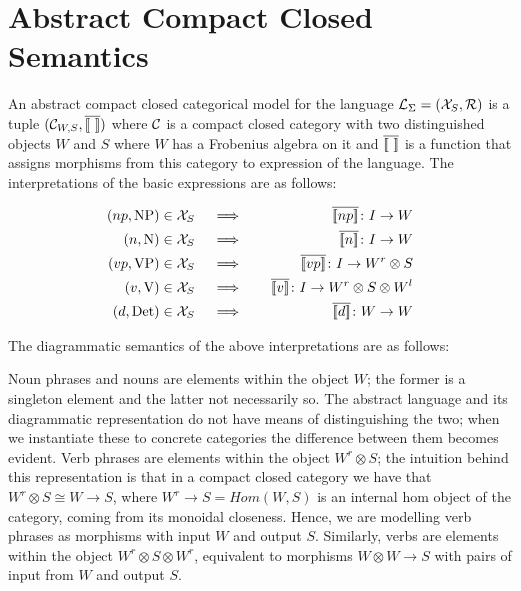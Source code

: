 \section{Abstract Compact Closed Semantics}


An abstract compact closed categorical model for the language  ${\cal L}_{\Sigma} = ({\cal X}_S, {\cal R})$  is  a tuple $({\cal C}_{W,S}, \overline{[\![ \  ]\!]})$ where  ${\cal C}$  is a compact closed category  with two distinguished objects $W$ and $S$ where  $W$ has a Frobenius algebra on it and $\overline{[\![ \  ]\!]}$ is a function that   assigns  morphisms from this category to  expression of the language. The interpretations of  the basic expressions  are as follows:

\begin{eqnarray*}
(np, \text{NP}) \in {\cal X}_S   &\quad \implies \quad& \overline{\semantics{np}} \colon I \to W \\
(n, \text{N}) \in {\cal X}_S   &\quad \implies \quad& \overline{\semantics{n}} \colon I \to W \\
(vp,  \text{VP}) \in {\cal X}_S &\quad \implies \quad& \overline{\semantics{vp}}   \colon I \to W^r \otimes S \\
(v, \text{V}) \in {\cal X}_S &\quad \implies \quad& \overline{\semantics{v}}  \colon I \to W^r \otimes S \otimes W^l  \\
(d, \text{Det}) \in  {\cal X}_S & \quad \implies \quad & \overline{\semantics{d}} \colon W \to W
\end{eqnarray*}

\noindent
The diagrammatic semantics of the above interpretations are as follows:

\begin{center}
 \qquad {} \qquad {}
\end{center}

\noindent
Noun phrases and nouns are elements  within the  object $W$; the former is a singleton element and the latter not necessarily so.  The abstract language and its diagrammatic representation do not have means of distinguishing the two;  when we instantiate these to concrete categories the difference between them becomes evident. Verb phrases are elements within the object $W^r \otimes S$; the intuition behind this representation is that in a compact closed category we have that $W^r \otimes S \cong W \to S$, where $W^r \to S = Hom(W,S)$ is an internal hom object of the category, coming from its monoidal closeness.  Hence,  we are modelling verb phrases as morphisms  with  input $W$ and  output $S$. Similarly, verbs are elements within the object $W^r \otimes S \otimes W^r$, equivalent to morphisms $W \otimes W \to S$ with pairs of  input  from $W$ and output  $S$. 


